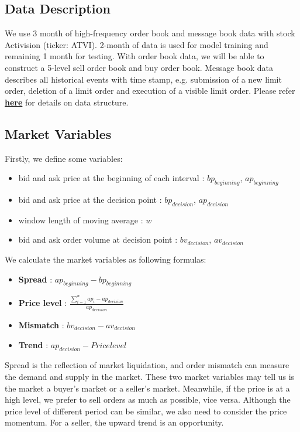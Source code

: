 \documentclass[12pt]{extarticle}
\begin{document}
\subsection{Data Description}
We use 3 month of high-frequency order book and message book data with stock Activision (ticker: ATVI). 2-month of data is used for model training and remaining 1 month for testing.
With order book data, we will be able to construct a 5-level sell order book and buy order book.
Message book data describes all historical events with time stamp, e.g. submission of a new limit order, deletion of a limit order and execution of a visible limit order. Please refer \href{https://lobsterdata.com/info/DataStructure.php}{\textbf{here}}
for details on data structure.

\subsection{Market Variables} \label{market-variables}

Firstly, we define some variables:
\begin{itemize}
  \item bid and ask price at the beginning of each interval : $bp_{beginning}$, $ap_{beginning}$
  \item bid and ask price at the decision point : $bp_{decision}$, $ap_{decision}$
  \item window length of moving average : $w$
  \item bid and ask order volume at decision point : $bv_{decision}$, $av_{decision}$
\end{itemize}
We calculate the market variables as following formulas:
\begin{itemize}
\item \textbf{Spread} : $ap_{beginning} - bp_{beginning}$
\item \textbf{Price level} : $\frac{\sum_{i=1}^{w}ap_i - ap_{decision}}{ap_{decision}}$
\item \textbf{Mismatch} : $bv_{decision} - av_{decision}$
\item \textbf{Trend} : $ap_{decision} - Price level$
\end{itemize}

Spread is the reflection of market liquidation, and order mismatch can measure the demand and supply in the market. These two market variables may tell us is the market a buyer's market or a seller's market. Meanwhile, if the price is at a high level, we prefer to sell orders as much as possible, vice versa. Although the price level of different period can be similar, we also need to consider the price momentum. For a seller, the upward trend is an opportunity.
\end{document}
